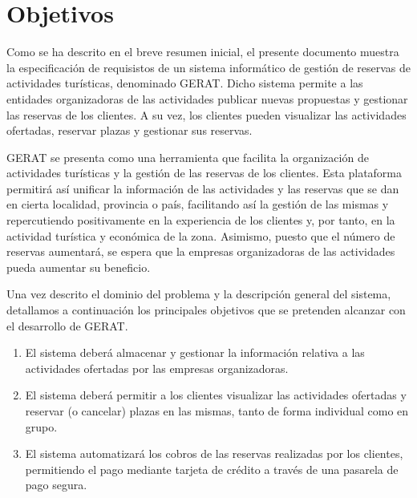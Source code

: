 \section{Objetivos}

Como se ha descrito en el breve resumen inicial, el presente documento muestra la especificación de requisistos de un sistema informático de gestión de reservas de actividades turísticas, denominado GERAT. Dicho sistema permite a las entidades organizadoras de las actividades publicar nuevas propuestas y gestionar las reservas de los clientes. A su vez, los clientes pueden visualizar las actividades ofertadas, reservar plazas y gestionar sus reservas.
        
GERAT se presenta como una herramienta que facilita la organización de actividades turísticas y la gestión de las reservas de los clientes. Esta plataforma permitirá así unificar la información de las actividades y las reservas que se dan en cierta localidad, provincia o país, facilitando así la gestión de las mismas y repercutiendo positivamente en la experiencia de los clientes y, por tanto, en la actividad turística y económica de la zona. Asimismo, puesto que el número de reservas aumentará, se espera que la empresas organizadoras de las actividades pueda aumentar su beneficio.

Una vez descrito el dominio del problema y la descripción general del sistema, detallamos a continuación los principales objetivos que se pretenden alcanzar con el desarrollo de GERAT.

\begin{enumerate}[label={\color{red}OBJ-\arabic{enumi}.}]
    \item El sistema deberá almacenar y gestionar la información relativa a las actividades ofertadas por las empresas organizadoras.
    \item El sistema deberá permitir a los clientes visualizar las actividades ofertadas y reservar (o cancelar) plazas en las mismas, tanto de forma individual como en grupo.
    \item El sistema automatizará los cobros de las reservas realizadas por los clientes, permitiendo el pago mediante tarjeta de crédito a través de una pasarela de pago segura.
\end{enumerate}


\begin{comment}
    El glosario, o a Glosario.tex (asegurandose de que nadie toca), o aquí en sucio y luego se pasará
\end{comment}